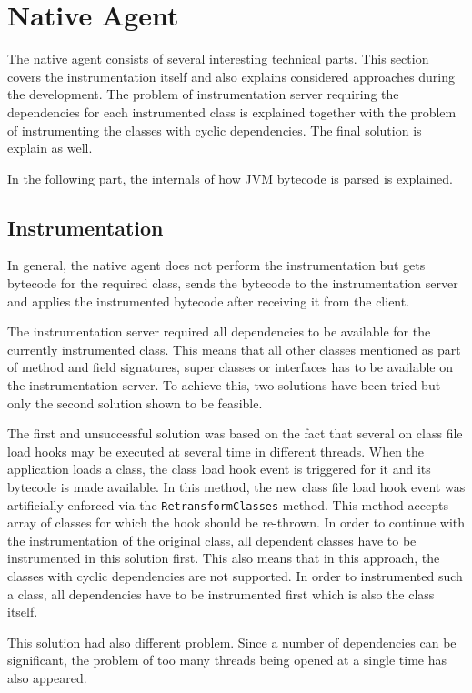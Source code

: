 \section{Native Agent}
The native agent consists of several interesting technical parts. This section covers the instrumentation itself and also explains considered approaches during the development. The problem of instrumentation server requiring the dependencies for each instrumented class is explained together with the problem of instrumenting the classes with cyclic dependencies. The final solution is explain as well. 

In the following part, the internals of how JVM bytecode is parsed is explained.
\subsection{Instrumentation}
In general, the native agent does not perform the instrumentation but gets bytecode for the required class, sends the bytecode to the instrumentation server and applies the instrumented bytecode after receiving it from the client. 

The instrumentation server required all dependencies to be available for the currently instrumented class. This means that all other classes mentioned as part of method and field signatures, super classes or interfaces has to be available on the instrumentation server. To achieve this, two solutions have been tried but only the second solution shown to be feasible.

The first and unsuccessful solution was based on the fact that several on class file load hooks may be executed at several time in different threads. When the application loads a class, the class load hook event is triggered for it and its bytecode is made available. In this method, the new class file load hook event was artificially enforced via the \texttt{RetransformClasses} method. This method accepts array of classes for which the hook should be re-thrown. In order to continue with the instrumentation of the original class, all dependent classes have to be instrumented in this solution first. This also means that in this approach, the classes with cyclic dependencies are not supported. In order to instrumented such a class, all dependencies have to be instrumented first which is also the class itself.

This solution had also different problem. Since a number of dependencies can be significant, the problem of too many threads being opened at a single time has also appeared. 

